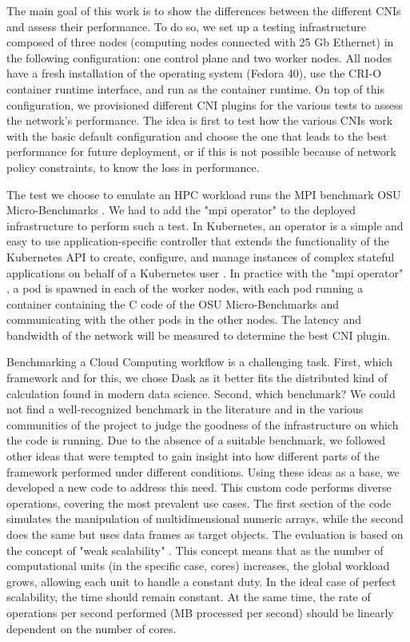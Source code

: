 The main goal of this work is to show the differences between the different CNIs
and assess their performance.
To do so, we set up a testing infrastructure composed of three nodes
(computing nodes connected with 25 Gb Ethernet) in the following configuration:
one control plane and two worker nodes. All nodes have a fresh installation of
the operating system (Fedora 40), use the CRI-O container runtime interface, and
run as the container runtime. On top of this configuration, we provisioned
different CNI plugins for the various tests to assess the network's performance.
The idea is first to test how the various CNIs work with the basic default
configuration and choose the one that leads to the best performance for future
deployment, or if this is not possible because of network policy constraints, to
know the loss in performance.

\noindent The test we choose to emulate an HPC workload runs the MPI benchmark OSU
Micro-Benchmarks \cite{osudoc}. We had to add the "mpi operator" to the deployed
infrastructure to perform such a test. In Kubernetes, an operator is a simple
and easy to use application-specific controller that extends the functionality
of the Kubernetes API to create, configure, and manage instances of complex
stateful applications on behalf of a Kubernetes user \cite{bookofkubernetes}.
In practice with the "mpi operator" , a pod is spawned in each of the worker
nodes, with each pod running a container containing the C code of the OSU
Micro-Benchmarks and communicating with the other pods in the other nodes. The
latency and bandwidth of the network will be measured to determine the best CNI
plugin.

Benchmarking a Cloud Computing workflow is a challenging task. First, which
framework and for this, we chose Dask as it better fits the distributed kind of
calculation found in modern data science.
Second, which benchmark? We could not find a well-recognized benchmark in the
literature and in the various communities of the project to judge the goodness
of the infrastructure on which the code is running.
Due to the absence of a suitable benchmark, we followed other ideas that were
tempted to gain insight into how different parts of the framework performed
under different conditions. Using these ideas as a base, we developed a new code
to address this need. This custom code performs diverse operations, covering the
most prevalent use cases.
The first section of the code simulates the manipulation of multidimensional
numeric arrays, while the second does the same but uses data frames as target
objects. The evaluation is based on the concept of "weak scalability" \cite{Hager2010}.
This concept means that as the number of computational units (in the specific
case, cores) increases, the global workload grows, allowing each unit to handle
a constant duty.
In the ideal case of perfect scalability, the time should remain constant. At
the same time, the rate of operations per second performed (MB processed per
second) should be linearly dependent on the number of cores.


